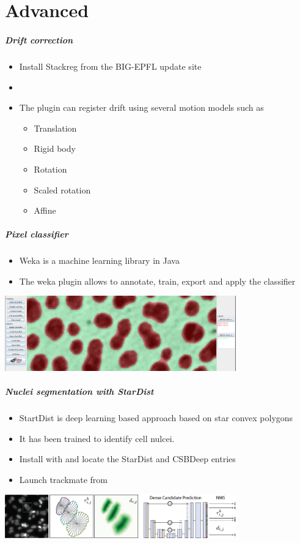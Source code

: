 \documentclass[ignorenonframetext,aspectratio=169,10pt,xcolor=table]{beamer}
\begin{document}
\part{Advanced}
\frame{\partpage}
\begin{frame} \frametitle{Drift correction}
  \begin{itemize}
  \item Install Stackreg from the BIG-EPFL update site
  \item {}
  \item The plugin can register drift using several motion models such
    as
    \begin{itemize}
    \item Translation
    \item Rigid body
    \item Rotation
    \item Scaled rotation
    \item Affine
    \end{itemize}
  \end{itemize}
\end{frame}

\begin{frame} \frametitle{Pixel classifier}
  \begin{itemize}
  \item Weka is a machine learning library in Java
  \item The weka plugin allows to annotate, train, export and apply
    the classifier
  \end{itemize}
  \begin{center} \includegraphics[width=0.75\textwidth]{weka}
  \end{center}
\end{frame}

\begin{frame} \frametitle{Nuclei segmentation with StarDist}
  \begin{itemize}
  \item StartDist is deep learning based approach based on star convex
    polygons
  \item It has been trained to identify cell nulcei.
  \item Install with  and locate the StarDist and
    CSBDeep entries
  \item Launch trackmate from 
  \end{itemize}
  \begin{center} \includegraphics[width=0.75\textwidth]{stardist}
  \end{center}
\end{frame}
\end{document}
